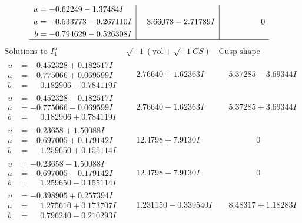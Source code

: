 \documentclass[1p]{elsarticle_modified}
\theoremstyle{definition}
\newcommand{\I}{\sqrt{-1}}
\begin{document}
$$\begin{array}{c|c|c}
\begin{aligned}
u &= -0.62249 - 1.37484 I \\
a &= -0.533773 - 0.267110 I \\
b &= -0.794629 - 0.526308 I\end{aligned}
 & \phantom{-}3.66078 - 2.71789 I & \phantom{-0.000000 } 0\\
 \hline 
 \end{array}$$\newpage$$\begin{array}{c|c|c}  
\text{Solutions to }I^u_{1}& \I (\text{vol} + \sqrt{-1}CS) & \text{Cusp shape}\\
 \hline 
\begin{aligned}
u &= -0.452328 + 0.182517 I \\
a &= -0.775066 + 0.069599 I \\
b &= \phantom{-}0.182906 - 0.784119 I\end{aligned}
 & \phantom{-}2.76640 + 1.62363 I & \phantom{-}5.37285 - 3.69344 I \\ \hline\begin{aligned}
u &= -0.452328 - 0.182517 I \\
a &= -0.775066 - 0.069599 I \\
b &= \phantom{-}0.182906 + 0.784119 I\end{aligned}
 & \phantom{-}2.76640 - 1.62363 I & \phantom{-}5.37285 + 3.69344 I \\ \hline\begin{aligned}
u &= -0.23658 + 1.50088 I \\
a &= -0.697005 + 0.179142 I \\
b &= \phantom{-}1.259650 + 0.155114 I\end{aligned}
 & \phantom{-}12.4798 + 7.9130 I & \phantom{-0.000000 } 0 \\ \hline\begin{aligned}
u &= -0.23658 - 1.50088 I \\
a &= -0.697005 - 0.179142 I \\
b &= \phantom{-}1.259650 - 0.155114 I\end{aligned}
 & \phantom{-}12.4798 - 7.9130 I & \phantom{-0.000000 } 0 \\ \hline\begin{aligned}
u &= -0.398905 + 0.257394 I \\
a &= \phantom{-}1.275610 + 0.173707 I \\
b &= \phantom{-}0.796240 - 0.210293 I\end{aligned}
 & \phantom{-}1.231150 - 0.339540 I & \phantom{-}8.48317 + 1.18283 I \\ \hline\begin{aligned}

\end{aligned}
\end{array}$$
\end{document}
